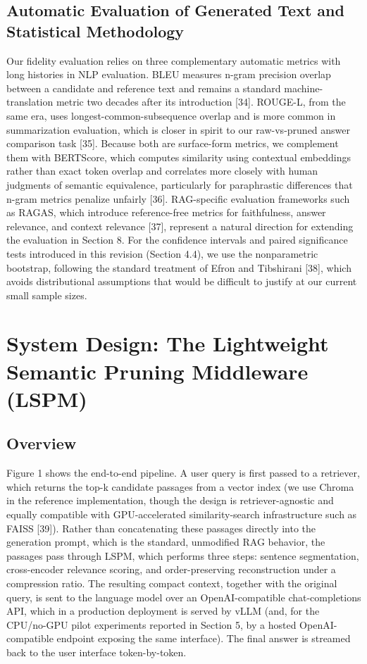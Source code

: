 \documentclass[pdflatex,sn-basic,Numbered]{sn-jnl}
\begin{document}
\subsection{Automatic Evaluation of Generated Text and Statistical Methodology}
Our fidelity evaluation relies on three complementary automatic metrics with long histories in NLP evaluation. BLEU measures n-gram precision overlap between a candidate and reference text and remains a standard machine-translation metric two decades after its introduction [34]. ROUGE-L, from the same era, uses longest-common-subsequence overlap and is more common in summarization evaluation, which is closer in spirit to our raw-vs-pruned answer comparison task [35]. Because both are surface-form metrics, we complement them with BERTScore, which computes similarity using contextual embeddings rather than exact token overlap and correlates more closely with human judgments of semantic equivalence, particularly for paraphrastic differences that n-gram metrics penalize unfairly [36]. RAG-specific evaluation frameworks such as RAGAS, which introduce reference-free metrics for faithfulness, answer relevance, and context relevance [37], represent a natural direction for extending the evaluation in Section 8. For the confidence intervals and paired significance tests introduced in this revision (Section 4.4), we use the nonparametric bootstrap, following the standard treatment of Efron and Tibshirani [38], which avoids distributional assumptions that would be difficult to justify at our current small sample sizes.

\section{System Design: The Lightweight Semantic Pruning Middleware (LSPM)}
\subsection{Overview}
Figure 1 shows the end-to-end pipeline. A user query is first passed to a retriever, which returns the top-k candidate passages from a vector index (we use Chroma in the reference implementation, though the design is retriever-agnostic and equally compatible with GPU-accelerated similarity-search infrastructure such as FAISS [39]). Rather than concatenating these passages directly into the generation prompt, which is the standard, unmodified RAG behavior, the passages pass through LSPM, which performs three steps: sentence segmentation, cross-encoder relevance scoring, and order-preserving reconstruction under a compression ratio. The resulting compact context, together with the original query, is sent to the language model over an OpenAI-compatible chat-completions API, which in a production deployment is served by vLLM (and, for the CPU/no-GPU pilot experiments reported in Section 5, by a hosted OpenAI-compatible endpoint exposing the same interface). The final answer is streamed back to the user interface token-by-token.
\end{document}
